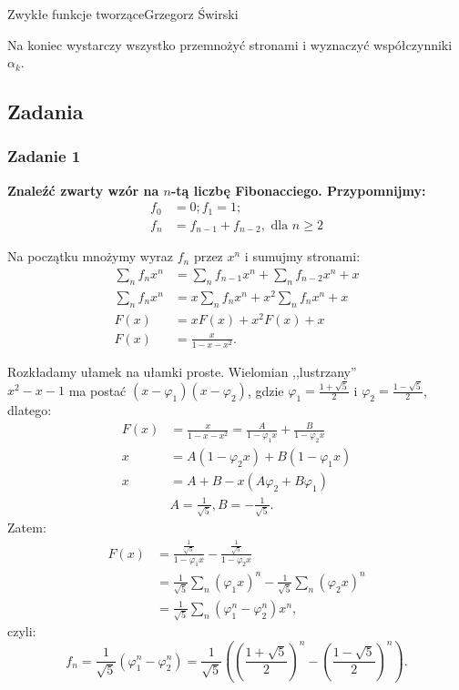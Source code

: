 \begin{referat}{Zwykłe funkcje tworzące}{Grzegorz Świrski}
\begin{teoria}
Na koniec wystarczy wszystko przemnożyć stronami i wyznaczyć współczynniki
$\alpha_k$.
\end{teoria}

\subsection{Zadania}

\subsubsection{Zadanie 1}
\textbf{Znaleźć zwarty wzór na $n$-tą liczbę Fibonacciego. Przypomnijmy:}
\begin{align*}
  f_0 &= 0; f_1 = 1; \\
  f_n &= f_{n-1} + f_{n-2}, \text{ dla } n \geqslant 2
\end{align*}

Na początku mnożymy wyraz $f_n$ przez $x^n$ i sumujmy stronami:
\begin{align*}
  \sum_n f_n x^n &= \sum_n f_{n-1} x^n + \sum_n f_{n-2} x^n + x \\
  \sum_n f_n x^n &= x \sum_n f_n x^n + x^2 \sum_n f_n x^n + x \\
  F(x) &= x F(x) + x^2 F(x) + x \\
  F(x) &= \frac{x}{1-x-x^2}.
\end{align*}

Rozkładamy ułamek na ułamki proste. Wielomian ,,lustrzany''\\ $x^2-x-1$ ma postać
$(x-\varphi_1)(x-\varphi_2)$, gdzie $\varphi_1 = \frac{1+\sqrt{5}}{2}$ i
$\varphi_2 = \frac{1-\sqrt{5}}{2}$, dlatego:
\begin{align*}
  F(x) &= \frac{x}{1-x-x^2} = \frac{A}{1-\varphi_1 x} + \frac{B}{1-\varphi_2 x} \\
  x &= A(1-\varphi_2 x) + B(1-\varphi_1 x) \\
  x &= A + B - x(A\varphi_2 + B\varphi_1) \\
  & A = \frac{1}{\sqrt{5}}, B = - \frac{1}{\sqrt{5}}.
\end{align*}
Zatem:
\begin{align*}
  F(x) &= \frac{\frac{1}{\sqrt{5}}}{1-\varphi_1 x} - \frac{\frac{1}{\sqrt{5}}}{1-\varphi_2 x} \\
  &= \frac{1}{\sqrt{5}} \sum_n (\varphi_1 x)^n - \frac{1}{\sqrt{5}} \sum_n (\varphi_2 x)^n \\
  &= \frac{1}{\sqrt{5}} \sum_n (\varphi_1^n - \varphi_2^n)x^n,
\end{align*}
czyli:
$$ f_n = \frac{1}{\sqrt{5}} (\varphi_1^n - \varphi_2^n) = \frac{1}{\sqrt{5}} \left(\left(\frac{1+\sqrt{5}}{2}\right)^n - \left(\frac{1-\sqrt{5}}{2}\right)^n\right).$$



\end{referat}
